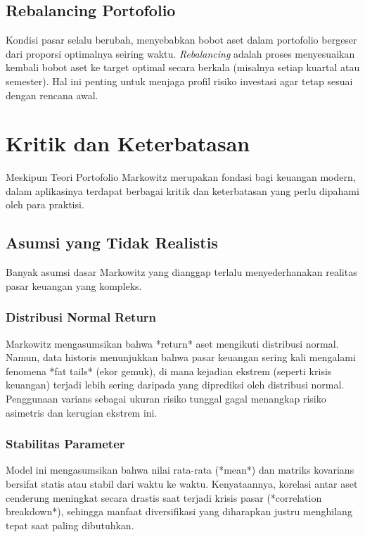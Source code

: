 \documentclass[12pt,a4paper]{book}
\begin{document}
\section{Rebalancing Portofolio}
Kondisi pasar selalu berubah, menyebabkan bobot aset dalam portofolio bergeser dari proporsi optimalnya seiring waktu. \textit{Rebalancing} adalah proses menyesuaikan kembali bobot aset ke target optimal secara berkala (misalnya setiap kuartal atau semester). Hal ini penting untuk menjaga profil risiko investasi agar tetap sesuai dengan rencana awal.

\chapter{Kritik dan Keterbatasan}

Meskipun Teori Portofolio Markowitz merupakan fondasi bagi keuangan modern, dalam aplikasinya terdapat berbagai kritik dan keterbatasan yang perlu dipahami oleh para praktisi.

\section{Asumsi yang Tidak Realistis}
Banyak asumsi dasar Markowitz yang dianggap terlalu menyederhanakan realitas pasar keuangan yang kompleks.

\subsection{Distribusi Normal Return}
Markowitz mengasumsikan bahwa *return* aset mengikuti distribusi normal. Namun, data historis menunjukkan bahwa pasar keuangan sering kali mengalami fenomena *fat tails* (ekor gemuk), di mana kejadian ekstrem (seperti krisis keuangan) terjadi lebih sering daripada yang diprediksi oleh distribusi normal. Penggunaan varians sebagai ukuran risiko tunggal gagal menangkap risiko asimetris dan kerugian ekstrem ini.

\subsection{Stabilitas Parameter}
Model ini mengasumsikan bahwa nilai rata-rata (*mean*) dan matriks kovarians bersifat statis atau stabil dari waktu ke waktu. Kenyataannya, korelasi antar aset cenderung meningkat secara drastis saat terjadi krisis pasar (*correlation breakdown*), sehingga manfaat diversifikasi yang diharapkan justru menghilang tepat saat paling dibutuhkan.
\end{document}
